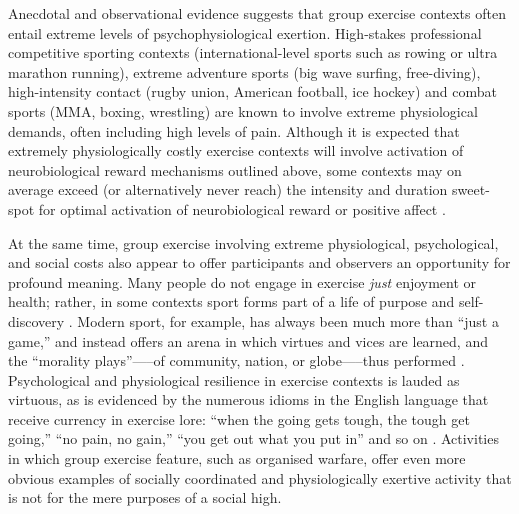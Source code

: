 \begin{CJK}{UTF8}{gbsn}

Anecdotal and observational evidence suggests that group exercise contexts often entail extreme levels of psychophysiological exertion.  High-stakes professional competitive sporting contexts (international-level sports such as rowing or ultra marathon running), extreme adventure sports (big wave surfing, free-diving), high-intensity contact (rugby union, American football, ice hockey) and combat sports (MMA, boxing, wrestling) are known to involve extreme physiological demands, often including high levels of pain.  Although it is expected that extremely physiologically costly exercise contexts will involve activation of neurobiological reward mechanisms outlined above, some contexts may on average exceed (or alternatively never reach) the intensity and duration sweet-spot for optimal activation of neurobiological reward \citep{Raichlen2013} or positive affect \citep[see Appendix~\ref{sect:neuroRewardGE} for more details on exercise-specific neuropharmacological effects)]{Ekkekakis2011,Reed2006}.

At the same time, group exercise involving extreme physiological, psychological, and social costs also appear to offer participants and observers an opportunity for profound meaning.  Many people do not engage in exercise \textit{just} enjoyment or health; rather, in some contexts sport forms part of a life of purpose and self-discovery \citep[see, for example][]{Jackson1995,Jones2004,White2011}.  Modern sport, for example, has always been much more than ``just a game,'' and instead offers an arena in which virtues and vices are learned, and the ``morality plays''—--of community, nation, or globe—--thus performed \citep{Elias1986,McNamee2008}.  Psychological and physiological resilience in exercise contexts is lauded as virtuous, as is evidenced by the numerous idioms in the English language that receive currency in exercise lore: ``when the going gets tough, the tough get going,'' ``no pain, no gain,'' ``you get out what you put in'' and so on \citep{Sarkar2014}.  Activities in which group exercise feature, such as organised warfare, offer even more obvious examples of socially coordinated and physiologically exertive activity that is not for the mere purposes of a social high.


\end{CJK}
